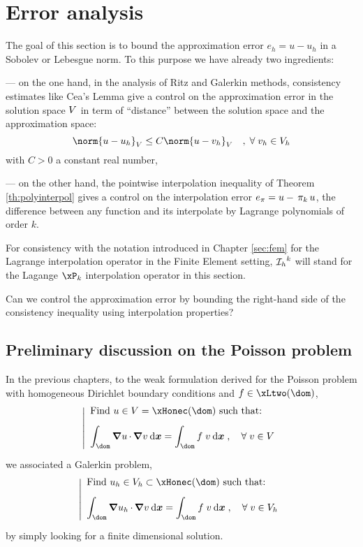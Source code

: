 
\chapter{Error analysis}\label{sec:error_analysis}

The goal of this section is to bound the approximation error $e_h = u - u_h$ in a Sobolev or Lebesgue norm.
To this purpose we have already two ingredients:

--- on the one hand, in the analysis of Ritz and Galerkin methods, consistency estimates like Cea's Lemma give a control on the approximation error in the solution space ${V}$ in term of ``distance'' between the solution space and the approximation space:
\begin{equation*}
\norm{u - u_h}_\xV  \leq C \norm{u - v_h}_\xV\quad,\; \forany v_h \in \xVh
\end{equation*}
with $C > 0$ a constant real number,

--- on the other hand, the pointwise interpolation inequality of Theorem \eqref{th:polyinterpol} gives a control on the interpolation error $e_{\pi} = u - \,\mathrm{\pi}_{k}\, u$, \ie the difference between any function and its interpolate by Lagrange polynomials of order $k$.

\medskip
For consistency with the notation introduced in Chapter \ref{sec:fem} for the Lagrange interpolation operator in the Finite Element setting, $\mathop{\mathcal{I}_{h}}^k$ will stand for the Lagange $\xP_k$ interpolation operator in this section.

\medskip
\Question Can we control the approximation error by bounding the right-hand side of the consistency inequality using interpolation properties?

\section{Preliminary discussion on the Poisson problem}

In the previous chapters, to the weak formulation derived for the Poisson problem with homogeneous Dirichlet boundary conditions and $f\in\xLtwo(\dom)$,
\begin{equation*}
\left\lvert
\begin{array}{ll}
\mbox{Find $u\in \xV = \xHonec(\dom)$ such that:}\\[2ex]
\displaystyle\int_\dom \Grad{u}\xDot\Grad{v} \dx = \int_\dom f\;v \dx\;,\quad\forany v \in\xV\\[2ex]
\end{array}
\right.
\end{equation*}
we associated a Galerkin problem,
\begin{equation*}
\left\lvert
\begin{array}{ll}
\mbox{Find $u_h\in\xVh\subset\xHonec(\dom)$ such that:}\\[2ex]
\displaystyle\int_\dom \Grad{u_h}\xDot\Grad{v} \dx = \int_\dom f\;v \dx\;,\quad\forany v \in\xVh\\[2ex]
\end{array}
\right.
\end{equation*}
by simply looking for a finite dimensional solution.


